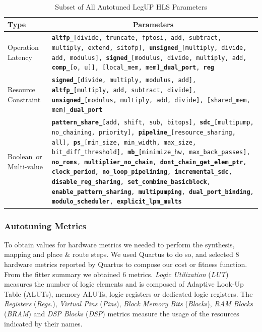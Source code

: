 \begin{table}[htpb]
\centering
\begin{tabular}{@{}p{}p{}@{}}
\toprule
Type & \multicolumn{1}{c}{Parameters} \\ \midrule
\parbox[t]{0.10\columnwidth}{\scriptsize{Operation \\ Latency}} & \scriptsize{\texttt{\textbf{altfp\_}[divide, truncate, fptosi, add, subtract, multiply, extend, sitofp], \textbf{unsigned\_}[multiply, divide, add, modulus], \textbf{signed\_}[modulus, divide, multiply, add, \textbf{comp\_}[o, u]], [local\_mem, mem]\textbf{\_dual\_port}, \textbf{reg}}} \\
\parbox[t]{0.10\columnwidth}{\scriptsize{Resource Constraint}} & \scriptsize{\texttt{\textbf{signed\_}[divide, multiply, modulus, add], \textbf{altfp\_}[multiply, add, subtract, divide], \textbf{unsigned\_}[modulus, multiply, add, divide], [shared\_mem, mem]\textbf{\_dual\_port}}} \\
\parbox[t]{0.10\columnwidth}{\scriptsize{Boolean~or Multi-value}} & \scriptsize{\texttt{\textbf{pattern\_share\_}[add, shift, sub, bitops], \textbf{sdc\_}[multipump, no\_chaining, priority], \textbf{pipeline\_}[resource\_sharing, all], \textbf{ps\_}[min\_size, min\_width, max\_size, bit\_diff\_threshold], \textbf{mb\_}[minimize\_hw, max\_back\_passes], \textbf{no\_roms}, \textbf{multiplier\_no\_chain}, \textbf{dont\_chain\_get\_elem\_ptr}, \textbf{clock\_period}, \textbf{no\_loop\_pipelining}, \textbf{incremental\_sdc}, \textbf{disable\_reg\_sharing}, \textbf{set\_combine\_basicblock}, \textbf{enable\_pattern\_sharing}, \textbf{multipumping}, \textbf{dual\_port\_binding}, \textbf{modulo\_scheduler}, \textbf{explicit\_lpm\_mults}}} \\ \bottomrule
\end{tabular}
\caption{Subset of All Autotuned LegUP HLS Parameters}
\label{tab:params}
\end{table}

\subsubsection{Autotuning Metrics}
\label{sec:metrics}

To obtain values for hardware metrics we needed to perform the synthesis,
mapping and place \& route steps. We used Quartus to do so, and selected 8
hardware metrics reported by Quartus to compose our cost or fitness function.
From the fitter summary we obtained 6 metrics. \textit{Logic Utilization}
(\textit{LUT}) measures the number of logic elements and is composed of
Adaptive Look-Up Table (ALUTs), memory ALUTs, logic registers or dedicated
logic registers.  The \textit{Registers} (\textit{Regs.}), \textit{Virtual
Pins} (\textit{Pins}), \textit{Block Memory Bits} (\textit{Blocks}),
\textit{RAM Blocks} (\textit{BRAM}) and \textit{DSP Blocks} (\textit{DSP})
metrics measure the usage of the resources indicated by their names.


